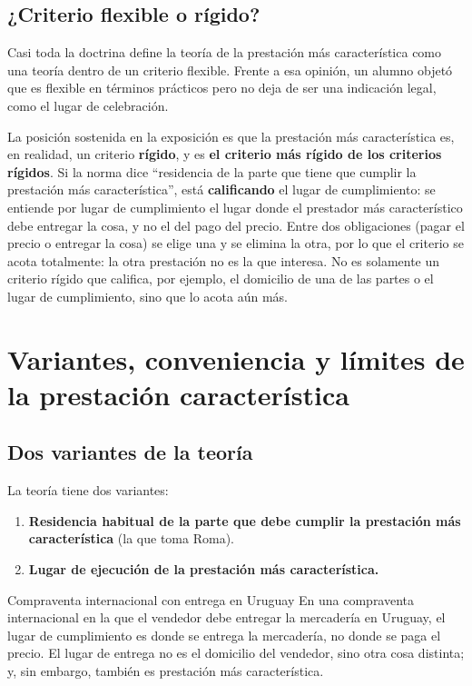 \documentclass[12pt,oneside]{book}
\begin{document}
\subsection{¿Criterio flexible o rígido?}

Casi toda la doctrina define la teoría de la prestación más característica como una teoría dentro de un criterio flexible. Frente a esa opinión, un alumno objetó que es flexible en términos prácticos pero no deja de ser una indicación legal, como el lugar de celebración.

La posición sostenida en la exposición es que la prestación más característica es, en realidad, un criterio \textbf{rígido}, y es \textbf{el criterio más rígido de los criterios rígidos}. Si la norma dice ``residencia de la parte que tiene que cumplir la prestación más característica'', está \textbf{calificando} el lugar de cumplimiento: se entiende por lugar de cumplimiento el lugar donde el prestador más característico debe entregar la cosa, y no el del pago del precio. Entre dos obligaciones (pagar el precio o entregar la cosa) se elige una y se elimina la otra, por lo que el criterio se acota totalmente: la otra prestación no es la que interesa. No es solamente un criterio rígido que califica, por ejemplo, el domicilio de una de las partes o el lugar de cumplimiento, sino que lo acota aún más.

\section{Variantes, conveniencia y límites de la prestación característica}

\subsection{Dos variantes de la teoría}

La teoría tiene dos variantes:

\begin{enumerate}
    \item \textbf{Residencia habitual de la parte que debe cumplir la prestación más característica} (la que toma Roma).
    \item \textbf{Lugar de ejecución de la prestación más característica.}
\end{enumerate}

\begin{example}{Compraventa internacional con entrega en Uruguay}
En una compraventa internacional en la que el vendedor debe entregar la mercadería en Uruguay, el lugar de cumplimiento es donde se entrega la mercadería, no donde se paga el precio. El lugar de entrega no es el domicilio del vendedor, sino otra cosa distinta; y, sin embargo, también es prestación más característica.
\end{example}
\end{document}

